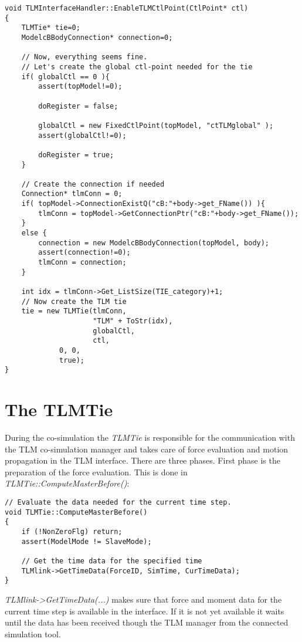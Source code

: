 {\scriptsize
\begin{verbatim}
void TLMInterfaceHandler::EnableTLMCtlPoint(CtlPoint* ctl)
{
    TLMTie* tie=0;
    ModelcBBodyConnection* connection=0;

    // Now, everything seems fine.
    // Let's create the global ctl-point needed for the tie
    if( globalCtl == 0 ){
        assert(topModel!=0);

        doRegister = false;

        globalCtl = new FixedCtlPoint(topModel, "ctTLMglobal" );
        assert(globalCtl!=0);

        doRegister = true;
    }

    // Create the connection if needed
    Connection* tlmConn = 0;
    if( topModel->ConnectionExistQ("cB:"+body->get_FName()) ){
        tlmConn = topModel->GetConnectionPtr("cB:"+body->get_FName());
    }
    else {
        connection = new ModelcBBodyConnection(topModel, body);
        assert(connection!=0);
        tlmConn = connection;
    }

    int idx = tlmConn->Get_ListSize(TIE_category)+1;
    // Now create the TLM tie
    tie = new TLMTie(tlmConn,
                     "TLM" + ToStr(idx),
                     globalCtl,
                     ctl,
		     0, 0,
		     true);
}
\end{verbatim}
}

\section{The TLMTie}

During the co-simulation the {\em TLMTie} is responsible for the
communication with the TLM co-simulation manager and takes care of
force evaluation and motion propagation in the TLM interface. There
are three phases. First phase is the preparation of the force
evaluation. This is done in {\em TLMTie::ComputeMasterBefore()}:

{\scriptsize
\begin{verbatim}
// Evaluate the data needed for the current time step.
void TLMTie::ComputeMasterBefore()
{
    if (!NonZeroFlg) return;
    assert(ModelMode != SlaveMode);

    // Get the time data for the specified time
    TLMlink->GetTimeData(ForceID, SimTime, CurTimeData);
}
\end{verbatim}
}

{\em TLMlink->GetTimeData(...)} makes sure that force and moment data
for the current time step is available in the interface. If it is not
yet available it waits until the data has been received though the TLM
manager from the connected simulation tool.


